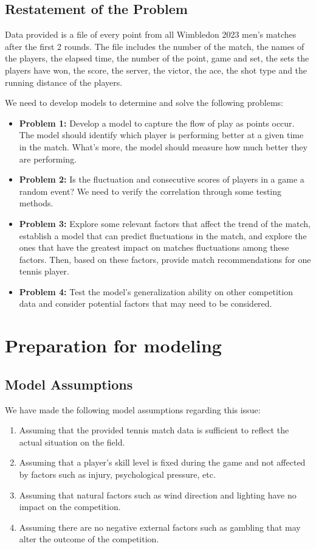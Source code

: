 \documentclass{mcmthesis}
\begin{document}
\subsection{Restatement of the Problem}
Data provided is a file of every point from all Wimbledon 2023 men’s matches after the first 2 rounds. The file includes the number of the match, the names of the players, the elapsed time, the number of the point, game and set, the sets the players have won, the score, the server, the victor, the ace, the shot type and the running distance of the players.

We need to develop models to determine and solve the following problems:
\begin{itemize}
  \item \textbf{Problem 1:} Develop a model to capture the flow of play as points occur. The model should identify which player is performing better at a given time in the match. What's more, the model should measure how much better they are performing.
  \item \textbf{Problem 2:} Is the fluctuation and consecutive scores of players in a game a random event? We need to verify the correlation through some testing methods.
  \item \textbf{Problem 3:} Explore some relevant factors that affect the trend of the match, establish a model that can predict fluctuations in the match, and explore the ones that have the greatest impact on matches fluctuations among these factors. Then, based on these factors, provide match recommendations for one tennis player.
  \item \textbf{Problem 4:} Test the model's generalization ability on other competition data and consider potential factors that may need to be considered.
\end{itemize}


\section{Preparation for modeling}
\subsection{Model Assumptions}
We have made the following model assumptions regarding this issue:
\begin{enumerate}
  \item Assuming that the provided tennis match data is sufficient to reflect the actual situation on the field.
  \item Assuming that a player's skill level is fixed during the game and not affected by factors such as injury, psychological pressure, etc.
  \item Assuming that natural factors such as wind direction and lighting have no impact on the competition.
  \item Assuming there are no negative external factors such as gambling that may alter the outcome of the competition.
\end{enumerate}
\end{document}
